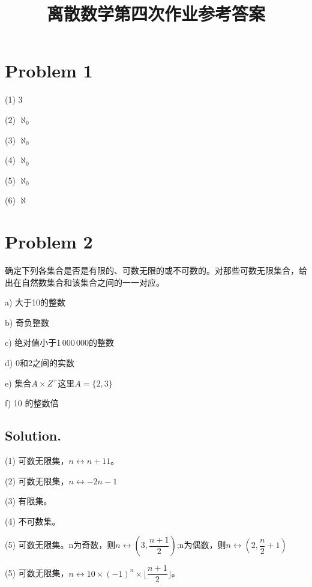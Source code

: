 \documentclass[a4paper]{article}
\begin{document}
\begin{CJK*}{GBK}{song}
\title{\textbf{\fontsize{20pt}{\baselineskip}\selectfont 离散数学第四次作业参考答案}}
\date{}\maketitle
\section*{Problem 1}
\begin{multicols}{5}
\begin{description}
\item (1) $3 $
\item (2) $\aleph_0$
\item (3) $\aleph_0$
\item (4) $\aleph_0$
\item (5) $\aleph_0$
\item (6) $\aleph$

\end{description}
\end{multicols}

\section*{Problem 2}
确定下列各集合是否是有限的、可数无限的或不可数的。对那些可数无限集合，给出在自然数集合和该集合之间的一一对应。
\begin{description}
\item a) 大于10的整数
\item b) 奇负整数
\item c) 绝对值小于1\,000\,000的整数
\item d) 0和2之间的实数
\item e) 集合$A\times Z^+$这里$A=\{2,3\}$
\item f) 10 的整数倍
\end{description}
\subsection*{Solution.}
\begin{description}
\item (1) 可数无限集，$n\leftrightarrow n+11$。
\item (2) 可数无限集，$n\leftrightarrow -2n-1$
\item (3) 有限集。
\item (4) 不可数集。
\item (5) 可数无限集。n为奇数，则$n\leftrightarrow (3, \dfrac{n+1}{2})$;n为偶数，则$n\leftrightarrow (2, \dfrac{n}{2}+1)$
\item (5) 可数无限集，$n\leftrightarrow 10\times (-1)^{n}\times \lfloor \dfrac{n+1}{2}\rfloor$。
\end{description}


\end{CJK*}
\end{document}
